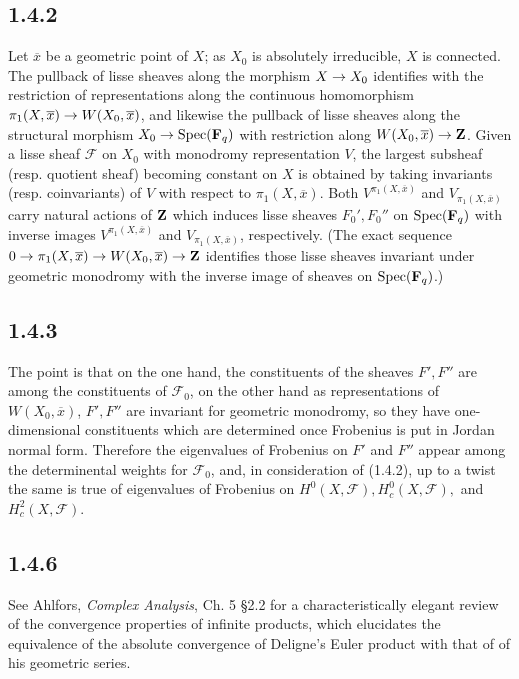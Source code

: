 \documentclass[deligne.tex]{subfiles}
\begin{document}
\subsection*{1.4.2} Let $\overline x$ be a geometric point of $X$; as $X_0$ is absolutely irreducible, $X$ is connected.
The pullback of lisse sheaves along the morphism $X\rightarrow X_0$ identifies
with the restriction of representations along the continuous homomorphism
$\pi_1(X,\overline x)\rightarrow W(X_0,\overline x)$, and likewise the pullback of
lisse sheaves along the structural morphism $X_0\rightarrow\operatorname{Spec}(\mathbf{F}_q)$ with
restriction along $W(X_0,\overline x)\rightarrow\mathbf{Z}$. Given a lisse sheaf 
$\mathscr F$ on $X_0$ with monodromy representation $V$, the largest 
subsheaf (resp. quotient sheaf) becoming constant on $X$ is obtained by
taking invariants (resp. coinvariants) of $V$ with respect to
$\pi_1(X,\overline x)$. Both $V^{\pi_1(X,\overline x)}$ and
$V_{\pi_1(X,\overline x)}$ carry natural actions of $\mathbf{Z}$ which induces
lisse sheaves $F_0',F_0''$ on $\operatorname{Spec}(\mathbf{F}_q)$ with inverse images
$V^{\pi_1(X,\overline x)}$ and $V_{\pi_1(X,\overline x)}$, respectively.
(The exact sequence $0\rightarrow\pi_1(X,\overline x)\rightarrow W(X_0,\overline x)\rightarrow\mathbf{Z}$
identifies those lisse sheaves invariant under geometric monodromy with
the inverse image of sheaves on $\operatorname{Spec}(\mathbf{F}_q)$.)

\subsection*{1.4.3} The point is that on the one hand, the constituents of 
the sheaves $F',F''$ are among the constituents of $\mathscr F_0$,
on the other hand as representations of $W(X_0,\overline x)$, $F',F''$ are
invariant for geometric monodromy, so they have one-dimensional constituents
which are determined once Frobenius is put in Jordan normal form. 
Therefore the eigenvalues of Frobenius on $F'$ and $F''$ appear 
among the determinental weights for $\mathscr F_0$, and, in consideration
of (1.4.2), up to a twist the same is true of eigenvalues
of Frobenius on $H^0(X,\mathscr F),H^0_c(X,\mathscr F),$ and
$H^2_c(X,\mathscr F)$.

\subsection*{1.4.6} See Ahlfors,
\emph{Complex Analysis}, Ch. 5 \S2.2 for a characteristically elegant 
review of the convergence properties of infinite products, which elucidates
the equivalence of the absolute convergence of Deligne's Euler product with
that of of his geometric series.
\end{document}
